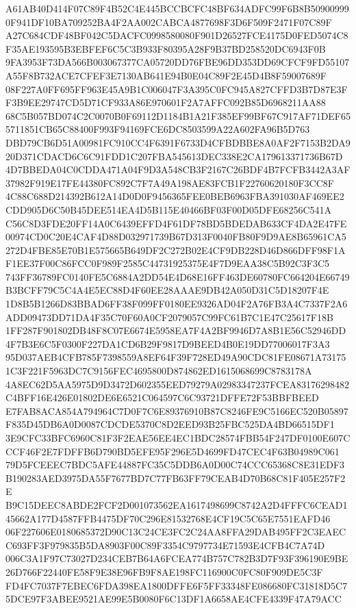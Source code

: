 \documentclass[UTF8,fontset=fandol,zihao=-4,a4paper]{ctexart}
\begin{document}
{{A61AB40D414F07C89F4B52C4E445BCCBCFC48BF634ADFC99F6B8B509009990F941DF10BA709252BA4F2AA002CABCA4877698F3D6F509F2471F07C89F
A27C684CDF48BF042C5DACFC0998580080F901D26527FCE4175D0FED5074C8F35AE193595B3EBFEF6C5C3B933F80395A28F9B37BD258520DC6943F0B
9FA3953F73DA566B003067377CA05720DD76FBE96DD353DD69CFCF9FD55107A55F8B732ACE7CFEF3E7130AB641E94B0E04C89F2E45D4B8F59007689F
08F227A0FF695FF963E45A9B1C006047F3A395C0FC945A827CFFD3B7D87E3FF3B9EE29747CD5D71CF933A86E970601F2A7AFFC092B85D6968211AA88
68C5B057BD074C2C0070B0F69112D1184B1A21F385EF99BF67C917AF71DEF655711851CB65C88400F993F94169FCE6DC8503599A22A602FA96B5D763
DBD79CB6D51A00981FC910CC4F6391F6733D4CFBDBBE8A0AF2F7153B2DA920D371CDACD6C6C91FDD1C207FBA545613DEC338E2CA179613371736B67D
4D7BBEDA04C0CDDA471A04F9D3A548CB3F2167C26BDF4B7FCFB3442A3AF37982F919E17FE44380FC892C7F7A49A198AE83FCB1F22760620180F3CC8F
4C88C688D214392B612A14D0D0F9456365FEE0BEB6963FBA391030AF469EE2CDD905D6C50B45DEE514EA4D5B115E40466BF03F00D05DFE68256C541A
C56C8D3FDE20FF14A0C6439EFFD4F61DF78BD5BDEDAB633CF4DA2E47FE00974CD0C20E4CAF4D88D032971739B67D313F0040FB80F9D9AE8B65961CA5
272D4FBE85E70B1E575665B649DF2C272B02E4CF9DB228D46D866DFF98F1AF1EE37F00C86FCC0F989F2585C44731925375E4F7D9EAA38C5B92C3F3C5
743FF36789FC0140FE5C6884A2DD54E4D68E16FF463DE60780FC664204E66749B3BCFF79C5C4A4E5EC88D4F60EE28AAAE9DB42A050D31C5D18207F4E
1D8B5B1266D83BBAD6FF38F099FF0180EE9326AD04F2A76FB3A4C7337F2A6ADD09473DD71DA4F35C70F60A0CF2079057C99FC61B7C1E47C25617F18B
1FF287F901802DB48F8C07E6674E5958EA7F4A2BF9946D7A8B1E56C52946DD4F7B3E6C5F0300F227DA1CD6B29F9817D9BEED4B0E19DD77006017F3A3
95D037AEB4CFB785F7398559A8EF64F39F728ED49A90CDC81FE08671A731751C3F221F5963DC7C9156FEC4695800D874862ED1615068699C8783178A
4A8EC62D5AA5975D9D3472D602355EED79279A02983347237FCEA83176298482C4BFF16E426E01802DE6E6521C064597C6C93721DFFE72F53BBFBEED
E7FAB8ACA854A794964C7D0F7C6E89376910B87C8246FE9C5166EC520B05897F835D45DB6A0D0087CDCDE5370C8D2EED93B25FBC525DA4BD66515DF1
3E9CFC33BFC6960C81F3F2EAE56EE4EC1BDC28574FBB54F247DF0100E607CCCF46F2E7FDFFB6D790BD5EFE95F296E5D4699FD47CEC4F63B04989C061
79D5FCEEEC7BDC5AFE44887FC35C5DDB6A0D00C74CCC65368C8E31EDF3B190283AED3975DA55F7677BD7C77FB63FF79CEAB4D70B68C81F405E257F2E
B9C15DEEC8ABDE2FCF2D001073562EA1617498699C8742A2D4FFFC6CEAD145662A177D4587FFB4475DF70C296E81532768E4CF19C5C65E7551EAFD46
06F227606E0180685372D90C13C24CE3FC2C24AA8FFA29DAB495FF2C3EAECC693FF3F979835B5DA8903F00C89F3354C9797734E71593E4CFB4C7A74D
006C3A1F97C73027D234CEB7B64A6FCEA774B757C782B3D7F93F396190E9BE26D766F22440FE58F9E38E96FB9F8AE198FC116900C0FC80F909DE5C3F
FD4FC7037F7EBEC6FDA398EA1800DFFE6F5FF33348FE086680FC31818D5C75DCE97F3ABEE9521AE99E5B0080F6C13DF1A6658AE4CFE4339F47A79ACC
}}
\end{document}
